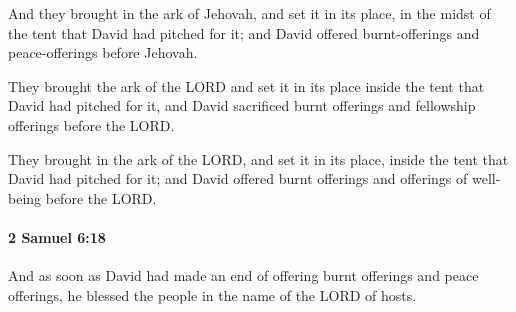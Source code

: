 			\begin{versebox}
					\item[BHS] 
					\item[ASV] And they brought in the ark of Jehovah, and set it in its place, in the midst of the tent that David had pitched for it; and David offered burnt-offerings and peace-offerings before Jehovah.
					\item[NIV] They brought the ark of the LORD and set it in its place inside the tent that David had pitched for it, and David sacrificed burnt offerings and fellowship offerings before the LORD.
					\item[NRSV] They brought in the ark of the LORD, and set it in its place, inside the tent that David had pitched for it; and David offered burnt offerings and offerings of well-being before the LORD.
			\end{versebox}

		\paragraph{2 Samuel 6:18} %
			\label{2SAMUEL-6-18}

			And as soon as David had made an end of offering burnt offerings and peace offerings, he blessed the people in the name of the LORD of hosts.

